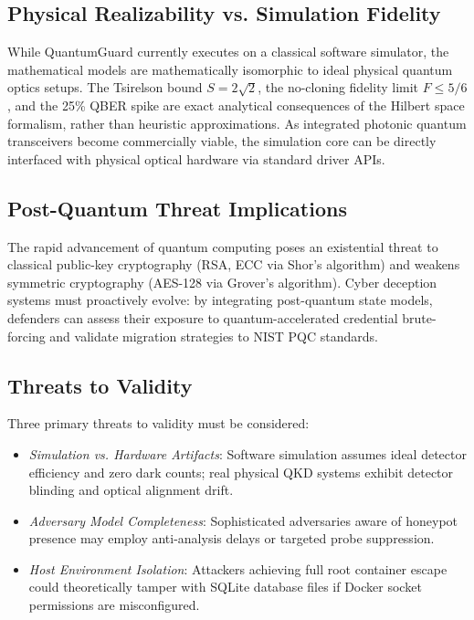 \documentclass[journal,10pt]{IEEEtran}
\begin{document}
\subsection{Physical Realizability vs. Simulation Fidelity}
While QuantumGuard currently executes on a classical software simulator, the mathematical models are mathematically isomorphic to ideal physical quantum optics setups. The Tsirelson bound $S = 2\sqrt{2}$, the no-cloning fidelity limit $F \le 5/6$, and the 25\% QBER spike are exact analytical consequences of the Hilbert space formalism, rather than heuristic approximations. As integrated photonic quantum transceivers become commercially viable, the simulation core can be directly interfaced with physical optical hardware via standard driver APIs.

\subsection{Post-Quantum Threat Implications}
The rapid advancement of quantum computing poses an existential threat to classical public-key cryptography (RSA, ECC via Shor's algorithm) and weakens symmetric cryptography (AES-128 via Grover's algorithm). Cyber deception systems must proactively evolve: by integrating post-quantum state models, defenders can assess their exposure to quantum-accelerated credential brute-forcing and validate migration strategies to NIST PQC standards.

\subsection{Threats to Validity}
Three primary threats to validity must be considered:
\begin{itemize}
    \item \emph{Simulation vs. Hardware Artifacts}: Software simulation assumes ideal detector efficiency and zero dark counts; real physical QKD systems exhibit detector blinding and optical alignment drift.
    \item \emph{Adversary Model Completeness}: Sophisticated adversaries aware of honeypot presence may employ anti-analysis delays or targeted probe suppression.
    \item \emph{Host Environment Isolation}: Attackers achieving full root container escape could theoretically tamper with SQLite database files if Docker socket permissions are misconfigured.
\end{itemize}
\end{document}
